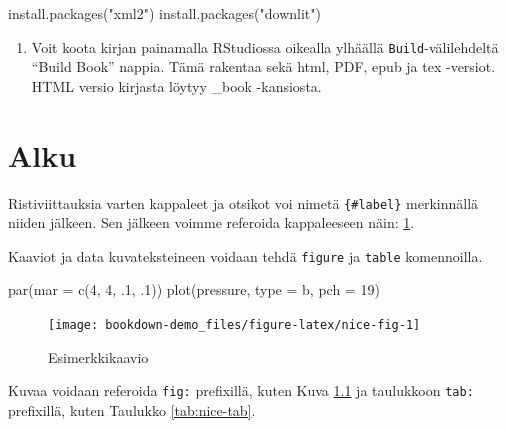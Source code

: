 \documentclass[
]{book}
\newenvironment{Shaded}{\begin{snugshade}}{\end{snugshade}}
\newcommand{\AttributeTok}[1]{\textcolor[rgb]{0.77,0.63,0.00}{#1}}
\newcommand{\DecValTok}[1]{\textcolor[rgb]{0.00,0.00,0.81}{#1}}
\newcommand{\FunctionTok}[1]{\textcolor[rgb]{0.00,0.00,0.00}{#1}}
\newcommand{\NormalTok}[1]{#1}
\newcommand{\StringTok}[1]{\textcolor[rgb]{0.31,0.60,0.02}{#1}}
\providecommand{\tightlist}{%
  \setlength{\itemsep}{0pt}\setlength{\parskip}{0pt}}
\theoremstyle{definition}
\theoremstyle{definition}
\theoremstyle{definition}
\theoremstyle{definition}
\theoremstyle{remark}
\begin{document}
\begin{Shaded}
\begin{Highlighting}[]
\FunctionTok{install.packages}\NormalTok{(}\StringTok{"xml2"}\NormalTok{)}
\FunctionTok{install.packages}\NormalTok{(}\StringTok{"downlit"}\NormalTok{)}
\end{Highlighting}
\end{Shaded}

\begin{enumerate}
\def\labelenumi{\arabic{enumi}.}
\setcounter{enumi}{3}
\tightlist
\item
  Voit koota kirjan painamalla RStudiossa oikealla ylhäällä \texttt{Build}-välilehdeltä ``Build Book'' nappia. Tämä rakentaa sekä html, PDF, epub ja tex -versiot. HTML versio kirjasta löytyy \_book -kansiosta.
\end{enumerate}

\hypertarget{alku}{%
\chapter{Alku}\label{alku}}

Ristiviittauksia varten kappaleet ja otsikot voi nimetä \texttt{\{\#label\}} merkinnällä niiden jälkeen. Sen jälkeen voimme referoida kappaleeseen näin: \ref{alku}.

Kaaviot ja data kuvateksteineen voidaan tehdä \texttt{figure} ja \texttt{table} komennoilla.

\begin{Shaded}
\begin{Highlighting}[]
\FunctionTok{par}\NormalTok{(}\AttributeTok{mar =} \FunctionTok{c}\NormalTok{(}\DecValTok{4}\NormalTok{, }\DecValTok{4}\NormalTok{, .}\DecValTok{1}\NormalTok{, .}\DecValTok{1}\NormalTok{))}
\FunctionTok{plot}\NormalTok{(pressure, }\AttributeTok{type =} \StringTok{\textquotesingle{}b\textquotesingle{}}\NormalTok{, }\AttributeTok{pch =} \DecValTok{19}\NormalTok{)}
\end{Highlighting}
\end{Shaded}

\begin{figure}

{\centering \texttt{[image: bookdown-demo\_files/figure-latex/nice-fig-1]} 

}

\caption{Esimerkkikaavio}\label{fig:nice-fig}
\end{figure}

Kuvaa voidaan referoida \texttt{fig:} prefixillä, kuten Kuva \ref{fig:nice-fig} ja taulukkoon \texttt{tab:} prefixillä, kuten Taulukko \ref{tab:nice-tab}.
\end{document}
